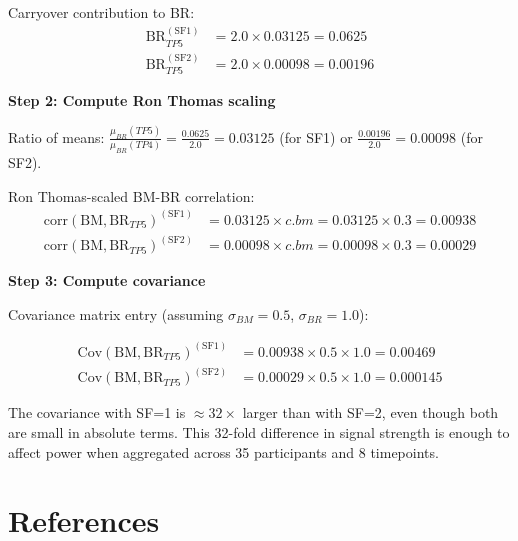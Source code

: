 \documentclass[12pt,a4paper]{article}
\begin{document}
Carryover contribution to BR:
\begin{align}
\text{BR}_{TP5}^{(\text{SF1})} &= 2.0 \times 0.03125 = 0.0625\\
\text{BR}_{TP5}^{(\text{SF2})} &= 2.0 \times 0.00098 = 0.00196
\end{align}

\textbf{Step 2: Compute Ron Thomas scaling}

Ratio of means: $\frac{\mu_{BR}(TP5)}{\mu_{BR}(TP4)} = \frac{0.0625}{2.0} = 0.03125$ (for SF1) or $\frac{0.00196}{2.0} = 0.00098$ (for SF2).

Ron Thomas-scaled BM-BR correlation:
\begin{align}
\text{corr}(\text{BM}, \text{BR}_{TP5})^{(\text{SF1})} &= 0.03125 \times c.bm = 0.03125 \times 0.3 = 0.00938\\
\text{corr}(\text{BM}, \text{BR}_{TP5})^{(\text{SF2})} &= 0.00098 \times c.bm = 0.00098 \times 0.3 = 0.00029
\end{align}

\textbf{Step 3: Compute covariance}

Covariance matrix entry (assuming $\sigma_{BM} = 0.5$, $\sigma_{BR} = 1.0$):

\begin{align}
\text{Cov}(\text{BM}, \text{BR}_{TP5})^{(\text{SF1})} &= 0.00938 \times 0.5 \times 1.0 = 0.00469\\
\text{Cov}(\text{BM}, \text{BR}_{TP5})^{(\text{SF2})} &= 0.00029 \times 0.5 \times 1.0 = 0.000145
\end{align}

The covariance with SF=1 is $\approx 32 \times$ larger than with SF=2, even though both are small in absolute terms. This 32-fold difference in signal strength is enough to affect power when aggregated across 35 participants and 8 timepoints.

\newpage

\section*{References}
\end{document}
